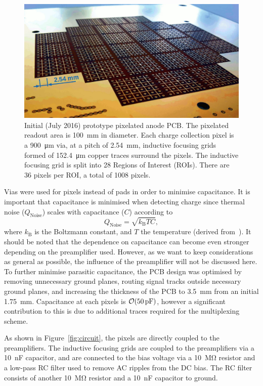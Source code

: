 \documentclass[instruments,article,submit,moreauthors,pdftex]{Definitions/mdpi}
\begin{document}
\begin{figure}[!ht]
	\centering
	\includegraphics[width=0.65\linewidth]{Figures/pixies.jpg}
	\caption{Initial (July 2016) prototype pixelated anode PCB. The pixelated readout area is \SI{100}{\milli\metre} in diameter.
		Each charge collection pixel is a \SI{900}{\micro\metre} via, at a pitch of \SI{2.54}{\milli\metre}, inductive focusing grids formed of \SI{152.4}{\micro\metre} copper traces surround the pixels. The inductive focusing grid is split into 28 Regions of Interest (ROIs). There are 36 pixels per ROI, a total of 1008 pixels.}
	\label{fig:pixies}
\end{figure}

Vias were used for pixels instead of pads in order to minimise capacitance.
It is important that capacitance is minimised when detecting charge since thermal noise ($Q_{\mathrm{Noise}}$) scales with capacitance ($C$) according to
\begin{equation}
	Q_{\mathrm{Noise}} = \sqrt{k_{\mathrm{B}}TC} \mathrm{,}
\end{equation}
where $k_{\mathrm{B}}$ is the Boltzmann constant, and $T$ the temperature (derived from~\cite{noise}).
It should be noted that the dependence on capacitance can become even stronger depending on the preamplifier used.
However, as we want to keep considerations as general as possible, the influence of the preamplifier will not be discussed here.
To further minimise parasitic capacitance, the PCB design was optimised by removing unnecessary ground planes, routing signal tracks outside necessary ground planes, and increasing the thickness of the PCB to \SI{3.5}{\milli\metre} from an initial \SI{1.75}{\milli\metre}. 
Capacitance at each pixels is $\order{\SI{50}{\pico\farad}}$, however a significant contribution to this is due to additional traces required for the multiplexing scheme.

As shown in Figure~\ref{fig:circuit}, the pixels are directly coupled to the preamplifiers.
The inductive focusing grids are coupled to the preamplifiers via a \SI{10}{\nano\farad} capacitor, and are connected to the bias voltage via a \SI{10}{\mega\ohm} resistor and a low-pass RC filter used to remove AC ripples from the DC bias. 
The RC filter consists of another \SI{10}{\mega\ohm} resistor and a \SI{10}{\nano\farad} capacitor to ground.   
\end{document}
